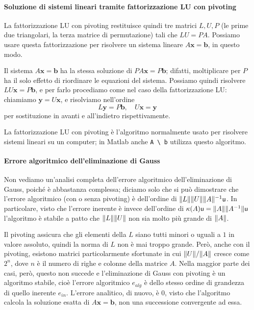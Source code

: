 \documentclass[a4paper]{report}
\DeclarePairedDelimiter{\norm}{\lVert}{\rVert}
\theoremstyle{definiton}
\theoremstyle{remark}
\newcommand{\x}{\mathbf{x}}
\renewcommand{\b}{\mathbf{b}}
\begin{document}
\paragraph{Soluzione di sistemi lineari tramite fattorizzazione LU con pivoting}

La fattorizzazione LU con pivoting restituisce quindi tre matrici $L,U,P$ (le prime due triangolari, la terza matrice di permutazione) tali che $LU = PA$. Possiamo usare questa fattorizzazione per risolvere un sistema lineare $A\x=\b$, in questo modo.

Il sistema $A\x = \b$ ha la stessa soluzione di $PA\x = P\b$; difatti, moltiplicare per $P$ ha il solo effetto di riordinare le equazioni del sistema. Possiamo quindi risolvere $LU\x=P\b$, e per farlo procediamo come nel caso della fattorizzazione LU: chiamiamo $\mathbf{y}=U\x$, e risolviamo nell'ordine
\[
L\mathbf{y} = P\b, \quad U\x = \mathbf{y}
\]
per sostituzione in avanti e all'indietro rispettivamente.

La fattorizzazione LU con pivoting è l'algoritmo normalmente usato per risolvere sistemi lineari su un computer; in Matlab 
anche \lstinline{A \ b} utilizza questo algoritmo.

\paragraph{Errore algoritmico dell'eliminazione di Gauss}
Non vediamo un'analisi completa dell'errore algoritmico dell'eliminazione di Gauss, poiché è abbastanza complessa; diciamo solo che si può dimostrare che l'errore algoritmico (con o senza pivoting) è dell'ordine di $\norm{L}\norm{U} \norm{A}^{-1} \mathsf{u}$. In particolare, visto che l'errore inerente è invece dell'ordine di $\kappa(A)\mathsf{u} = \norm{A}\norm{A^{-1}}\mathsf{u}$  l'algoritmo è stabile a patto che $\norm{L}\norm{U}$ non sia molto più grande di $\norm{A}$.

Il pivoting assicura che gli elementi della $L$ siano tutti minori o uguali a $1$ in valore assoluto, quindi la norma di $L$ non è mai troppo grande. Però, anche con il pivoting, esistono matrici particolarmente sfortunate in cui $\norm{U}/\norm{A}$ cresce come $2^n$, dove $n$ è il numero di righe e colonne della matrice $A$. Nella maggior parte dei casi, però, questo non succede e l'eliminazione di Gauss con pivoting è un algoritmo stabile, cioè l'errore algoritmico $e_{alg}$ è dello stesso ordine di grandezza di quello inerente $e_{in}$. L'errore analitico, di nuovo, è $0$, visto che l'algoritmo calcola la soluzione esatta di $A\x=\b$, non una successione convergente ad essa.
\end{document}
